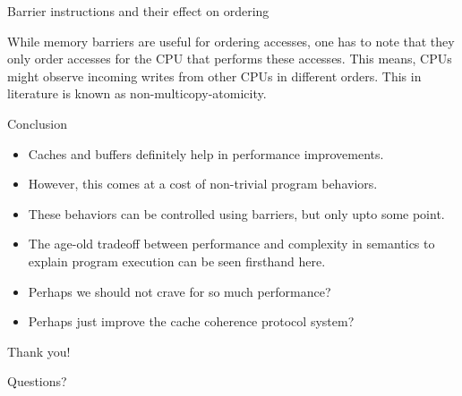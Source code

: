\documentclass[notes, xcolor = dvipsnames]{beamer}
\begin{document}
    \begin{frame}{Barrier instructions and their effect on ordering}

        While memory barriers are useful for ordering accesses, one has to note that they only order accesses for the CPU that performs these accesses. 
        This means, CPUs might observe incoming writes from other CPUs in different orders.
        This in literature is known as non-multicopy-atomicity. 
    
    \end{frame}

    \begin{frame}{Conclusion}
    
        \begin{itemize}
            \item Caches and buffers definitely help in performance improvements.
            \item However, this comes at a cost of non-trivial program behaviors.
            \item These behaviors can be controlled using barriers, but only upto some point. 
            \item The age-old tradeoff between performance and complexity in semantics to explain program execution can be seen firsthand here. 
            \item Perhaps we should not crave for so much performance?
            \item Perhaps just improve the cache coherence protocol system?  
        \end{itemize}

    \end{frame}

    \begin{frame}{Thank you!}
        
        Questions? 

    \end{frame}
\end{document}
